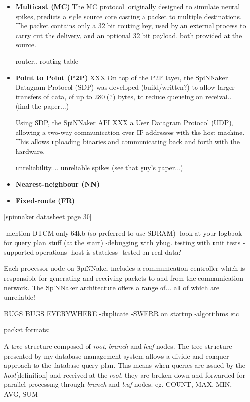 \begin{itemize}
\item \textbf{Multicast (MC)}
The MC protocol, originally designed to simulate neural spikes, predicts a sigle source core casting a packet to multiple destinations. The packet contains only a 32 bit routing key, used by an external process to carry out the delivery, and an optional 32 bit payload, both provided at the source.

router.. routing table
\item \textbf{Point to Point (P2P)}
XXX
On top of the P2P layer, the SpiNNaker Datagram Protocol (SDP) was developed (build/written?) to allow larger transfers of data, of up to 280 (?) bytes, to reduce queueing on receival... (find the paper...)

Using SDP, the SpiNNaker API XXX a User Datagram Protocol (UDP), allowing a two-way communication over IP addresses with the host machine. This allows uploading binaries and communicating back and forth with the hardware.

unreliability....
unreliable spikes (see that guy's paper...)

\item \textbf{Nearest-neighbour (NN)}
\item \textbf{Fixed-route (FR)}
\end{itemize}

[spinnaker datasheet page 30]

-mention DTCM only 64kb (so preferred to use SDRAM)
-look at your logbook for query plan stuff (at the start)
-debugging with ybug. testing with unit tests
-supported operations
-host is stateless
-tested on real data?

Each processor node on SpiNNaker includes a communication controller which is responsible for generating and receiving packets to and from the communication network.
The SpiNNaker architecture offers a range of...
all of which are unreliable!!

BUGS BUGS EVERYWHERE
-duplicate
-SWERR on startup
-algorithms etc

packet formats:


A tree structure composed of \textit{root}, \textit{branch} and \textit{leaf} nodes. The tree structure presented by my database management system allows a divide and conquer approach to the database query plan. This means when queries are issued by the \textit{host}[definition] and received at the \textit{root}, they are broken down and forwarded for parallel processing through \textit{branch} and \textit{leaf} nodes. eg. COUNT, MAX, MIN, AVG, SUM

